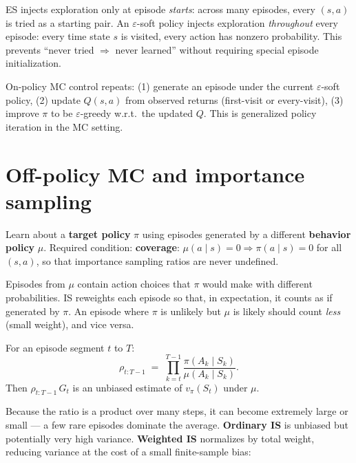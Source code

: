 \documentclass[11pt, oneside]{book}
\newcommand{\vpi}{v_{\pi}}              %
\begin{document}
\begin{intbox}[title={Exploring Starts vs.\ $\varepsilon$-Soft}]
ES injects exploration only at episode \emph{starts}: across many episodes,
every $(s,a)$ is tried as a starting pair.
An $\varepsilon$-soft policy injects exploration \emph{throughout} every
episode: every time state $s$ is visited, every action has nonzero probability.
This prevents ``never tried $\Rightarrow$ never learned'' without requiring
special episode initialization.
\end{intbox}

On-policy MC control repeats: (1) generate an episode under the current
$\varepsilon$-soft policy, (2) update $Q(s,a)$ from observed returns
(first-visit or every-visit), (3) improve $\pi$ to be $\varepsilon$-greedy
w.r.t.\ the updated $Q$. This is generalized policy iteration in the MC
setting.

\section{Off-policy MC and importance sampling}

\begin{defbox}[title={Off-Policy Learning}]
Learn about a \textbf{target policy} $\pi$ using episodes generated by a
different \textbf{behavior policy} $\mu$. Required condition:
\textbf{coverage}: $\mu(a\mid s)=0 \Rightarrow \pi(a\mid s)=0$ for all
$(s,a)$, so that importance sampling ratios are never undefined.
\end{defbox}

\begin{intbox}[title={Why Importance Sampling Is Needed}]
Episodes from $\mu$ contain action choices that $\pi$ would make with
different probabilities. IS reweights each episode so that, in expectation,
it counts as if generated by $\pi$. An episode where $\pi$ is unlikely but
$\mu$ is likely should count \emph{less} (small weight), and vice versa.
\end{intbox}

\begin{thmbox}[title={Importance Sampling Ratio}]
For an episode segment $t$ to $T$:
\[
  \rho_{t:T-1} \;=\; \prod_{k=t}^{T-1}\frac{\pi(A_k\mid S_k)}{\mu(A_k\mid S_k)}.
\]
Then $\rho_{t:T-1}\,G_t$ is an unbiased estimate of $\vpi(S_t)$ under $\mu$.
\end{thmbox}

Because the ratio is a product over many steps, it can become extremely
large or small --- a few rare episodes dominate the average.
\textbf{Ordinary IS} is unbiased but potentially very high variance.
\textbf{Weighted IS} normalizes by total weight, reducing variance at the
cost of a small finite-sample bias:
\end{document}
